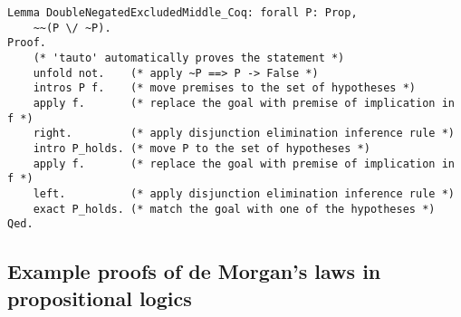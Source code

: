 \documentclass[article]{aaltoseries}
\begin{document}
\begin{lstlisting}[language=coq,
    caption={Proof of the double-negated excluded middle in Coq},
    label={ex_double_neg_ex_mid_coq}]
Lemma DoubleNegatedExcludedMiddle_Coq: forall P: Prop,
    ~~(P \/ ~P).
Proof.
    (* 'tauto' automatically proves the statement *)
    unfold not.    (* apply ~P ==> P -> False *)
    intros P f.    (* move premises to the set of hypotheses *)
    apply f.       (* replace the goal with premise of implication in f *)
    right.         (* apply disjunction elimination inference rule *)
    intro P_holds. (* move P to the set of hypotheses *)
    apply f.       (* replace the goal with premise of implication in f *)
    left.          (* apply disjunction elimination inference rule *)
    exact P_holds. (* match the goal with one of the hypotheses *)
Qed.
\end{lstlisting}


\newpage
\subsection{Example proofs of de Morgan's laws in propositional logics}
\label{apx:morgan_propos}
\end{document}
